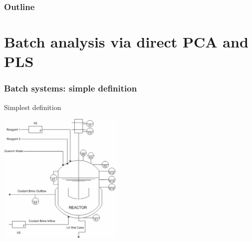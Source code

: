 \documentclass[handout, 12pt]{beamer}
\begin{document}
\begin{frame}\frametitle{Outline}
\tableofcontents
\end{frame}

%

\section{Batch analysis via direct PCA and PLS}

\begin{frame}\frametitle{Batch systems: simple definition}

\begin{exampleblock}{Simplest definition}
\end{exampleblock}
	
\begin{center}
	\includegraphics[width=6cm]{images/batch-system.png}	
\end{center}

\end{frame}	
\end{document}
